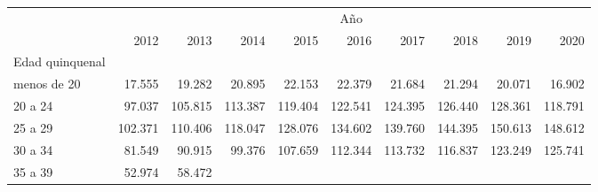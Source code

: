 \begin{tabular}{llllllllll}
\cline{1-10}
\multicolumn{1}{c}{} &
  \multicolumn{9}{|c}{Año} \\
\multicolumn{1}{c}{} &
  \multicolumn{1}{|r}{2012} &
  \multicolumn{1}{r}{2013} &
  \multicolumn{1}{r}{2014} &
  \multicolumn{1}{r}{2015} &
  \multicolumn{1}{r}{2016} &
  \multicolumn{1}{r}{2017} &
  \multicolumn{1}{r}{2018} &
  \multicolumn{1}{r}{2019} &
  \multicolumn{1}{r}{2020} \\
\cline{1-10}
\multicolumn{1}{l}{Edad quinquenal} &
  \multicolumn{1}{|r}{} &
  \multicolumn{1}{r}{} &
  \multicolumn{1}{r}{} &
  \multicolumn{1}{r}{} &
  \multicolumn{1}{r}{} &
  \multicolumn{1}{r}{} &
  \multicolumn{1}{r}{} &
  \multicolumn{1}{r}{} &
  \multicolumn{1}{r}{} \\
\multicolumn{1}{l}{\hspace{1em}menos de 20} &
  \multicolumn{1}{|r}{17.555} &
  \multicolumn{1}{r}{19.282} &
  \multicolumn{1}{r}{20.895} &
  \multicolumn{1}{r}{22.153} &
  \multicolumn{1}{r}{22.379} &
  \multicolumn{1}{r}{21.684} &
  \multicolumn{1}{r}{21.294} &
  \multicolumn{1}{r}{20.071} &
  \multicolumn{1}{r}{16.902} \\
\multicolumn{1}{l}{\hspace{1em}20 a 24} &
  \multicolumn{1}{|r}{97.037} &
  \multicolumn{1}{r}{105.815} &
  \multicolumn{1}{r}{113.387} &
  \multicolumn{1}{r}{119.404} &
  \multicolumn{1}{r}{122.541} &
  \multicolumn{1}{r}{124.395} &
  \multicolumn{1}{r}{126.440} &
  \multicolumn{1}{r}{128.361} &
  \multicolumn{1}{r}{118.791} \\
\multicolumn{1}{l}{\hspace{1em}25 a 29} &
  \multicolumn{1}{|r}{102.371} &
  \multicolumn{1}{r}{110.406} &
  \multicolumn{1}{r}{118.047} &
  \multicolumn{1}{r}{128.076} &
  \multicolumn{1}{r}{134.602} &
  \multicolumn{1}{r}{139.760} &
  \multicolumn{1}{r}{144.395} &
  \multicolumn{1}{r}{150.613} &
  \multicolumn{1}{r}{148.612} \\
\multicolumn{1}{l}{\hspace{1em}30 a 34} &
  \multicolumn{1}{|r}{81.549} &
  \multicolumn{1}{r}{90.915} &
  \multicolumn{1}{r}{99.376} &
  \multicolumn{1}{r}{107.659} &
  \multicolumn{1}{r}{112.344} &
  \multicolumn{1}{r}{113.732} &
  \multicolumn{1}{r}{116.837} &
  \multicolumn{1}{r}{123.249} &
  \multicolumn{1}{r}{125.741} \\
\multicolumn{1}{l}{\hspace{1em}35 a 39} &
  \multicolumn{1}{|r}{52.974} &
  \multicolumn{1}{r}{58.472} &

\end{tabular}
